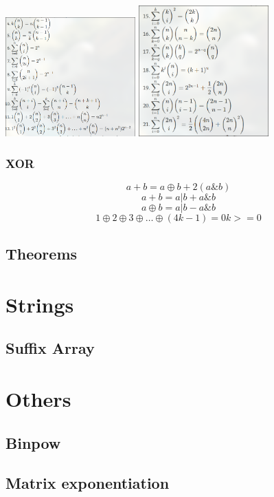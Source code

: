 	\begin{center}
	\includegraphics[width=5cm]{Combi2}
	\includegraphics[width=5cm]{Combi}
	\end{center}
	
	\subsubsection{XOR}
	$$ a + b = a \oplus b + 2(a\& b)$$
	$$a + b = a|b + a\&b$$
	$$a \oplus b = a|b - a\&b$$
	$$1\oplus 2\oplus 3 \oplus \dots \oplus(4k-1) = 0  k>=0$$
	
	
	
	
	\subsection{Theorems}
	
	
	\section{Strings}
	\subsection{Suffix Array}
	
	
	
	\section{Others}
	\subsection{Binpow}
	\subsection{Matrix exponentiation}
	
	
